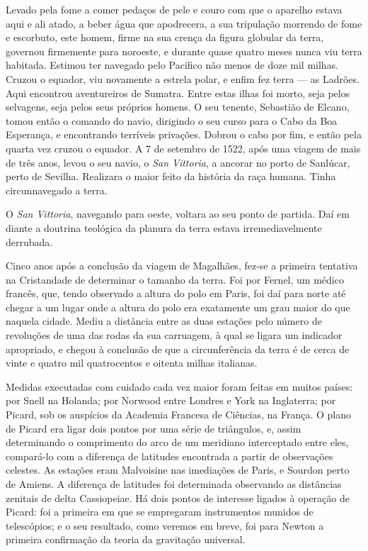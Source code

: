 \documentclass[11pt,a5paper,twoside,openany]{book}
\begin{document}
Levado pela fome a comer pedaços de pele e couro com que o aparelho estava aqui e ali atado, a beber água que apodrecera, a sua tripulação morrendo de fome e escorbuto, este homem, firme na sua crença da figura globular da terra, governou firmemente para noroeste, e durante quase quatro meses nunca viu terra habitada. Estimou ter navegado pelo Pacífico não menos de doze mil milhas. Cruzou o equador, viu novamente a estrela polar, e enfim fez terra — as Ladrões. Aqui encontrou aventureiros de Sumatra. Entre estas ilhas foi morto, seja pelos selvagens, seja pelos seus próprios homens. O seu tenente, Sebastião de Elcano, tomou então o comando do navio, dirigindo o seu curso para o Cabo da Boa Esperança, e encontrando terríveis privações. Dobrou o cabo por fim, e então pela quarta vez cruzou o equador. A 7 de setembro de 1522, após uma viagem de mais de três anos, levou o seu navio, o \textit{San Vittoria}, a ancorar no porto de Sanlúcar, perto de Sevilha. Realizara o maior feito da história da raça humana. Tinha circunnavegado a terra.

O \textit{San Vittoria}, navegando para oeste, voltara ao seu ponto de partida. Daí em diante a doutrina teológica da planura da terra estava irremediavelmente derrubada.

Cinco anos após a conclusão da viagem de Magalhães, fez-se a primeira tentativa na Cristandade de determinar o tamanho da terra. Foi por Fernel, um médico francês, que, tendo observado a altura do polo em Paris, foi daí para norte até chegar a um lugar onde a altura do polo era exatamente um grau maior do que naquela cidade. Mediu a distância entre as duas estações pelo número de revoluções de uma das rodas da sua carruagem, à qual se ligara um indicador apropriado, e chegou à conclusão de que a circunferência da terra é de cerca de vinte e quatro mil quatrocentos e oitenta milhas italianas.

Medidas executadas com cuidado cada vez maior foram feitas em muitos países: por Snell na Holanda; por Norwood entre Londres e York na Inglaterra; por Picard, sob os auspícios da Academia Francesa de Ciências, na França. O plano de Picard era ligar dois pontos por uma série de triângulos, e, assim determinando o comprimento do arco de um meridiano interceptado entre eles, compará-lo com a diferença de latitudes encontrada a partir de observações celestes. As estações eram Malvoisine nas imediações de Paris, e Sourdon perto de Amiens. A diferença de latitudes foi determinada observando as distâncias zenitais de delta Cassiopeiae. Há dois pontos de interesse ligados à operação de Picard: foi a primeira em que se empregaram instrumentos munidos de telescópios; e o seu resultado, como veremos em breve, foi para Newton a primeira confirmação da teoria da gravitação universal.
\end{document}
